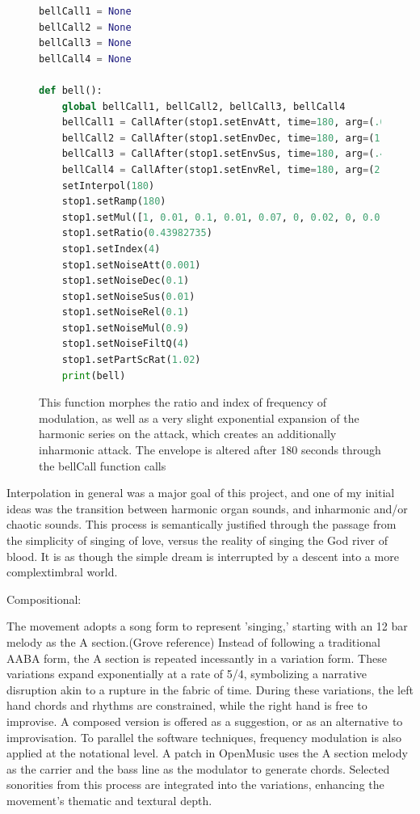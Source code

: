 \documentclass[12pt,twoside,maitrise]{dms_ks}
\theoremstyle{definition}
\begin{document}
\begin{figure}[H]
\begin{lstlisting}[language=Python]
bellCall1 = None
bellCall2 = None
bellCall3 = None
bellCall4 = None

def bell():
    global bellCall1, bellCall2, bellCall3, bellCall4 
    bellCall1 = CallAfter(stop1.setEnvAtt, time=180, arg=(.001, .001, .001, .001, 0.001, 0.001, 0.0001, 0.0006, 0.0007, 0.0005, 0.0006, 0.0003, 0.0005, 0.0003, 0.0006, 0.0005, 0.0004, 0.0002, 0.0001, 0.0001)).play()
    bellCall2 = CallAfter(stop1.setEnvDec, time=180, arg=(1.3, .05, .02, 0, 0, 0.04, .004, 0.04, .04, 0.04, .04, 0.04, .04, 0.04, .04, 0.04, .04, 0.04, .04, 0.04)).play()
    bellCall3 = CallAfter(stop1.setEnvSus, time=180, arg=(.4, .1, .02, .01, .01, 0.01, .01, 0.01, .01, 0.01, .01, 0.01, .01, 0.01, .01, 0.01, .01, 0.01, .002, 0.002)).play()
    bellCall4 = CallAfter(stop1.setEnvRel, time=180, arg=(2, 0.1, 0.1, .01, .03, 0.4, .04, 0.04, .04, 0.04, .04, 0.04, .04, 0.04, .04, 0.4, .04, 0.04, .04, 0.4)).play()
    setInterpol(180)
    stop1.setRamp(180)
    stop1.setMul([1, 0.01, 0.1, 0.01, 0.07, 0, 0.02, 0, 0.01, 0, 0.003, 0, 0.003, 0, 0.001, 0, 0.001, 0, 0.001, 0])
    stop1.setRatio(0.43982735)
    stop1.setIndex(4)
    stop1.setNoiseAtt(0.001)
    stop1.setNoiseDec(0.1)
    stop1.setNoiseSus(0.01)
    stop1.setNoiseRel(0.1)    
    stop1.setNoiseMul(0.9)
    stop1.setNoiseFiltQ(4)
    stop1.setPartScRat(1.02)
    print(bell)
\end{lstlisting}
\caption{This function morphes the ratio and index of frequency of modulation, as well as a very slight exponential expansion of the harmonic series on the attack, which creates an additionally inharmonic attack. The envelope is altered after 180 seconds through the bellCall function calls}
\end{figure}

Interpolation in general was a major goal of this project, and one of my initial ideas was the transition between harmonic organ sounds, and inharmonic and/or chaotic sounds.
This process is semantically justified through the passage from the simplicity of singing of love, versus the reality of singing the God river of blood.
It is as though the simple dream is interrupted by a descent into a more complextimbral world.

Compositional:

The movement adopts a song form to represent 'singing,' starting with an 12 bar melody as the A section.(Grove reference)
Instead of following a traditional AABA form, the A section is repeated incessantly in a variation form.
These variations expand exponentially at a rate of 5/4, symbolizing a narrative disruption akin to a rupture in the fabric of time.
During these variations, the left hand chords and rhythms are constrained, while the right hand is free to improvise. 
A composed version is offered as a suggestion, or as an alternative to improvisation.
To parallel the software techniques, frequency modulation is also applied at the notational level.
A patch in OpenMusic uses the A section melody as the carrier and the bass line as the modulator to generate chords.
Selected sonorities from this process are integrated into the variations, enhancing the movement's thematic and textural depth.
\end{document}
